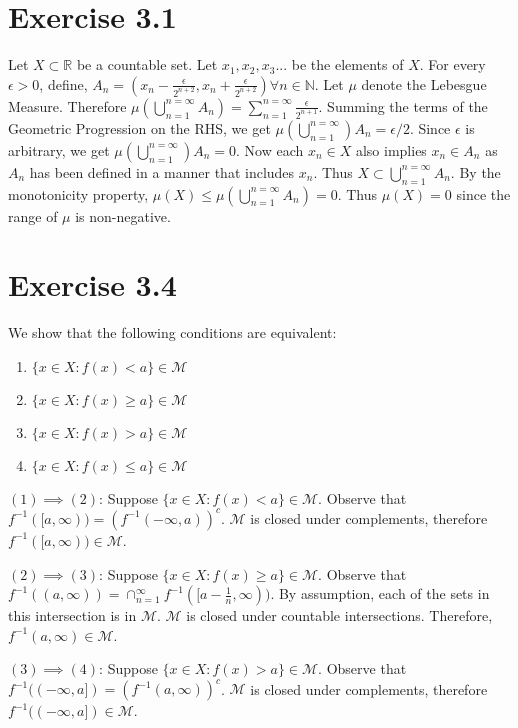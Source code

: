 \documentclass{article}
\begin{document}
  \section*{Exercise 3.1}
    Let $X \subset \mathbb R$ be a countable set. Let $x_1, x_2, x_3 ...$ be the elements of $X$. For every $\epsilon > 0$, define, $A_n = (x_n - \frac{\epsilon}{2^{n+2}}, x_n + \frac{\epsilon}{2^{n+2}}) \forall n \in \mathbb N$.
    Let $\mu$ denote the Lebesgue Measure. Therefore $\mu(\bigcup_{n=1}^{n=\infty}A_n) = \sum_{n=1}^{n=\infty}\frac{\epsilon}{2^{n+1}}$. Summing the terms of the Geometric Progression on the RHS, we get
    $\mu(\bigcup_{n=1}^{n=\infty})A_n = \epsilon /2$. Since $\epsilon$ is arbitrary, we get $\mu(\bigcup_{n=1}^{n=\infty})A_n = 0$. Now each $x_n \in X$ also implies $x_n \in A_n$ as $A_n$ has been defined in a manner that includes $x_n$.
    Thus $X \subset \bigcup_{n=1}^{n=\infty}A_n$. By the monotonicity property, $\mu(X) \le \mu(\bigcup_{n=1}^{n=\infty}A_n) = 0$. Thus $\mu(X) = 0$ since the range of $\mu$ is non-negative.

  \section*{Exercise 3.4}
  We show that the following conditions are equivalent:
    \begin{enumerate}
      \item $\{x \in X : f(x) < a \} \in \mathcal{M}$
      \item $\{x \in X : f(x) \geq a \} \in \mathcal{M}$
      \item $\{x \in X : f(x) > a \} \in \mathcal{M}$
      \item $\{x \in X : f(x) \leq a \} \in \mathcal{M}$
    \end{enumerate}


      $(1) \implies (2)$: Suppose $\{x \in X : f(x) < a \} \in \mathcal{M}$. Observe that $f^{-1}([a, \infty)) = (f^{-1}(-\infty, a))^c$. $\mathcal{M}$
      is closed under complements, therefore $f^{-1}([a, \infty)) \in \mathcal{M}$.

      $(2) \implies (3)$: Suppose $\{x \in X : f(x) \geq a \} \in \mathcal{M}$. Observe that $f^{-1}((a, \infty)) = \cap_{n=1}^{\infty} f^{-1}([a - \frac{1}{n}, \infty))$.
      By assumption, each of the sets in this intersection is in $\mathcal{M}$. $\mathcal{M}$
      is closed under countable intersections. Therefore, $f^{-1}(a, \infty) \in \mathcal{M}$.

      $(3) \implies (4)$:  Suppose $\{x \in X : f(x) > a \} \in \mathcal{M}$. Observe that $f^{-1}((-\infty, a]) = (f^{-1}(a, \infty))^c$. $\mathcal{M}$
      is closed under complements, therefore $f^{-1}((-\infty, a]) \in \mathcal{M}$.
\end{document}
